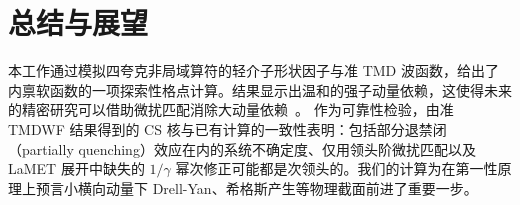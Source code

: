 \section{总结与展望}

本工作通过模拟四夸克非局域算符的轻介子形状因子与准 TMD 波函数，给出了内禀软函数的一项探索性格点计算。结果显示出温和的强子动量依赖，这使得未来的精密研究可以借助微扰匹配消除大动量依赖~\cite{Ji:2020ect}。
作为可靠性检验，由准 TMDWF 结果得到的 CS 核与已有计算的一致性表明：{包括部分退禁闭（partially quenching）效应在内的}系统不确定度、仅用领头阶微扰匹配以及 LaMET 展开中缺失的 $1/\gamma$ 幂次修正{可能}都是次领头的。我们的计算为在第一性原理上预言小横向动量下 Drell-Yan、希格斯产生等物理截面前进了重要一步。
